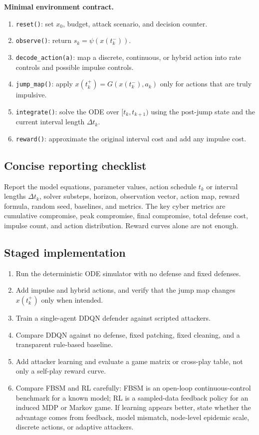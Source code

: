 \documentclass[11pt,a4paper]{article}
\begin{document}
\begin{methodbox}
\textbf{Minimal environment contract.}
\begin{enumerate}
\item \texttt{reset()}: set $x_0$, budget, attack scenario, and decision counter.
\item \texttt{observe()}: return $s_k=\psi(x(t_k^-))$.
\item \texttt{decode\_action(a)}: map a discrete, continuous, or hybrid action into rate controls and possible impulse controls.
\item \texttt{jump\_map()}: apply $x(t_k^+)=G(x(t_k^-),a_k)$ only for actions that are truly impulsive.
\item \texttt{integrate()}: solve the ODE over $[t_k,t_{k+1})$ using the post-jump state and the current interval length $\Delta t_k$.
\item \texttt{reward()}: approximate the original interval cost and add any impulse cost.
\end{enumerate}
\end{methodbox}

\subsection{Concise reporting checklist}
Report the model equations, parameter values, action schedule $t_k$ or interval lengths $\Delta t_k$, solver substeps, horizon, observation vector, action map, reward formula, random seed, baselines, and metrics.  The key cyber metrics are cumulative compromise, peak compromise, final compromise, total defense cost, impulse count, and action distribution.  Reward curves alone are not enough.

\subsection{Staged implementation}
\begin{enumerate}
\item Run the deterministic ODE simulator with no defense and fixed defenses.
\item Add impulse and hybrid actions, and verify that the jump map changes $x(t_k^+)$ only when intended.
\item Train a single-agent DDQN defender against scripted attackers.
\item Compare DDQN against no defense, fixed patching, fixed cleaning, and a transparent rule-based baseline.
\item Add attacker learning and evaluate a game matrix or cross-play table, not only a self-play reward curve.
\item Compare FBSM and RL carefully: FBSM is an open-loop continuous-control benchmark for a known model; RL is a sampled-data feedback policy for an induced MDP or Markov game. If learning appears better, state whether the advantage comes from feedback, model mismatch, node-level epidemic scale, discrete actions, or adaptive attackers.
\end{enumerate}
\end{document}
